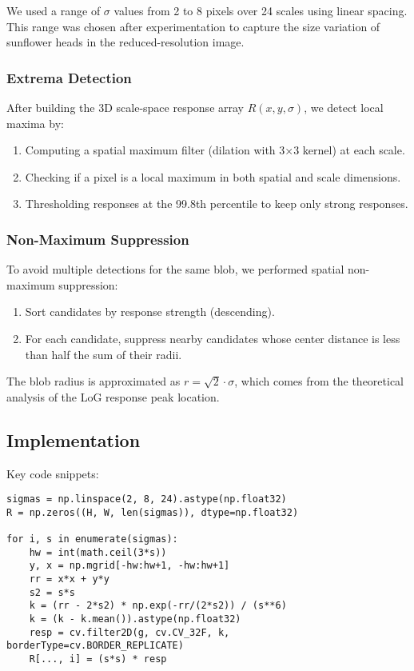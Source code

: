 \documentclass[11pt,a4paper]{article}
\begin{document}
We used a range of $\sigma$ values from 2 to 8 pixels over 24 scales using linear spacing. This range was chosen after experimentation to capture the size variation of sunflower heads in the reduced-resolution image.

\subsubsection{Extrema Detection}
After building the 3D scale-space response array $R(x, y, \sigma)$, we detect local maxima by:
\begin{enumerate}
    \item Computing a spatial maximum filter (dilation with 3×3 kernel) at each scale.
    \item Checking if a pixel is a local maximum in both spatial and scale dimensions.
    \item Thresholding responses at the 99.8th percentile to keep only strong responses.
\end{enumerate}

\subsubsection{Non-Maximum Suppression}
To avoid multiple detections for the same blob, we performed spatial non-maximum suppression:
\begin{enumerate}
    \item Sort candidates by response strength (descending).
    \item For each candidate, suppress nearby candidates whose center distance is less than half the sum of their radii.
\end{enumerate}

The blob radius is approximated as $r = \sqrt{2} \cdot \sigma$, which comes from the theoretical analysis of the LoG response peak location.

\subsection{Implementation}
Key code snippets:

\begin{lstlisting}[caption={LoG kernel generation and scale-space construction}]
sigmas = np.linspace(2, 8, 24).astype(np.float32)
R = np.zeros((H, W, len(sigmas)), dtype=np.float32)

for i, s in enumerate(sigmas):
    hw = int(math.ceil(3*s))
    y, x = np.mgrid[-hw:hw+1, -hw:hw+1]
    rr = x*x + y*y
    s2 = s*s
    k = (rr - 2*s2) * np.exp(-rr/(2*s2)) / (s**6)
    k = (k - k.mean()).astype(np.float32)
    resp = cv.filter2D(g, cv.CV_32F, k, borderType=cv.BORDER_REPLICATE)
    R[..., i] = (s*s) * resp
\end{lstlisting}
\end{document}
